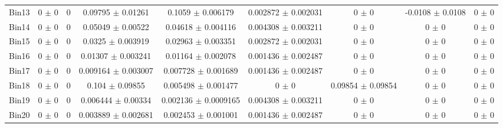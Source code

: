 \begin{tabular}{@{\extracolsep{4pt}}lcccccccc@{}}
     Bin13 & 0 $\pm$ 0 & 0 & 0.09795 $\pm$ 0.01261 & 0.1059 $\pm$ 0.006179 & 0.002872 $\pm$ 0.002031 & 0 $\pm$ 0 & -0.0108 $\pm$ 0.0108 & 0 $\pm$ 0 \\ 
     Bin14 & 0 $\pm$ 0 & 0 & 0.05049 $\pm$ 0.00522 & 0.04618 $\pm$ 0.004116 & 0.004308 $\pm$ 0.003211 & 0 $\pm$ 0 & 0 $\pm$ 0 & 0 $\pm$ 0 \\ 
     Bin15 & 0 $\pm$ 0 & 0 & 0.0325 $\pm$ 0.003919 & 0.02963 $\pm$ 0.003351 & 0.002872 $\pm$ 0.002031 & 0 $\pm$ 0 & 0 $\pm$ 0 & 0 $\pm$ 0 \\ 
     Bin16 & 0 $\pm$ 0 & 0 & 0.01307 $\pm$ 0.003241 & 0.01164 $\pm$ 0.002078 & 0.001436 $\pm$ 0.002487 & 0 $\pm$ 0 & 0 $\pm$ 0 & 0 $\pm$ 0 \\ 
     Bin17 & 0 $\pm$ 0 & 0 & 0.009164 $\pm$ 0.003007 & 0.007728 $\pm$ 0.001689 & 0.001436 $\pm$ 0.002487 & 0 $\pm$ 0 & 0 $\pm$ 0 & 0 $\pm$ 0 \\ 
     Bin18 & 0 $\pm$ 0 & 0 & 0.104 $\pm$ 0.09855 & 0.005498 $\pm$ 0.001477 & 0 $\pm$ 0 & 0.09854 $\pm$ 0.09854 & 0 $\pm$ 0 & 0 $\pm$ 0 \\ 
     Bin19 & 0 $\pm$ 0 & 0 & 0.006444 $\pm$ 0.00334 & 0.002136 $\pm$ 0.0009165 & 0.004308 $\pm$ 0.003211 & 0 $\pm$ 0 & 0 $\pm$ 0 & 0 $\pm$ 0 \\ 
     Bin20 & 0 $\pm$ 0 & 0 & 0.003889 $\pm$ 0.002681 & 0.002453 $\pm$ 0.001001 & 0.001436 $\pm$ 0.002487 & 0 $\pm$ 0 & 0 $\pm$ 0 & 0 $\pm$ 0 \\ 
\hline\hline
  \end{tabular}
